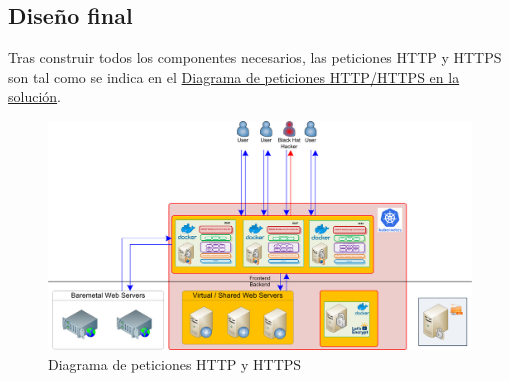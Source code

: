 \subsection{Diseño final}
\par Tras construir todos los componentes necesarios, las peticiones HTTP y HTTPS son tal como se indica en el \hyperref[fig:Diagram_HTTP_Services]{Diagrama de peticiones HTTP/HTTPS en la solución}.
\begin{figure}[!ht]
  \centering
  \label{fig:Diagram_HTTP_Services}
  \includegraphics[width=\textwidth]{fig/Diagram_HTTP_Services}
  \caption{Diagrama de peticiones HTTP y HTTPS}
\end{figure}
